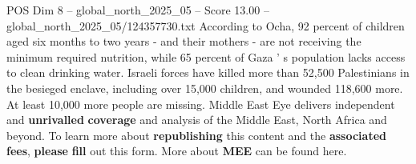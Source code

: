 \begin{textsample}{POS Dim 8 – global\_north\_2025\_05 – Score 13.00 – global\_north\_2025\_05/124357730.txt}
According to Ocha, 92 percent of children aged six months to two years - and their mothers - are not receiving the minimum required nutrition, while 65 percent of Gaza ' s population lacks access to clean drinking water.
Israeli forces have killed more than 52,500 Palestinians in the besieged enclave, including over 15,000 children, and wounded 118,600 more.
At least 10,000 more people are missing.
Middle East Eye delivers independent and \textbf{unrivalled} \textbf{coverage} and analysis of the Middle East, North Africa and beyond.
To learn more about \textbf{republishing} this content and the \textbf{associated} \textbf{fees}, \textbf{please} \textbf{fill} out this form.
More about \textbf{MEE} can be found here.

\end{textsample}
